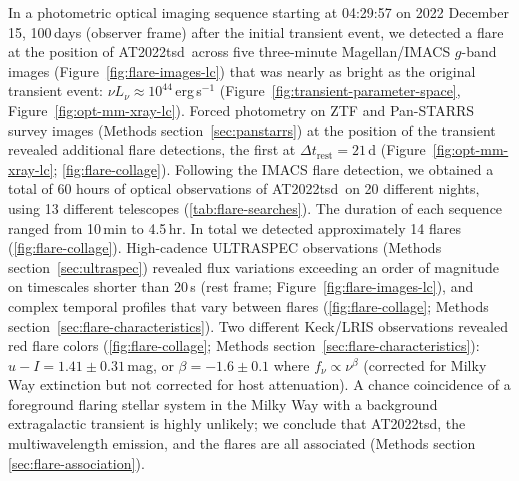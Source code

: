 \documentclass{nature_plusfigure}
\newcommand{\at}{AT2022tsd}
\begin{document}
In a photometric optical imaging sequence starting at 04:29:57 on 2022 December 15, 100\,days (observer frame) after the initial transient event, we detected\cite{Ho2022_Astronote_Flares} a flare at the position of \at\ across five three-minute Magellan/IMACS $g$-band images (Figure~\ref{fig:flare-images-lc}) that was nearly as bright as the original transient event: $\nu L_\nu \approx 10^{44}\,$erg\,s$^{-1}$ (Figure~\ref{fig:transient-parameter-space}, Figure~\ref{fig:opt-mm-xray-lc}).
Forced photometry on ZTF and Pan-STARRS survey images (Methods section~\ref{sec:panstarrs}) at the position of the transient revealed additional flare detections, the first at $\Delta t_\mathrm{rest}=21$\,d (Figure~\ref{fig:opt-mm-xray-lc}; \ref{fig:flare-collage}).
Following the IMACS flare detection, we obtained a total of 60 hours of optical observations of \at\ on 20 different nights, using 13 different telescopes (\ref{tab:flare-searches}). The duration of each sequence ranged from 10\,min to 4.5\,hr. In total we detected approximately 14 flares (\ref{fig:flare-collage}). High-cadence ULTRASPEC observations (Methods section~\ref{sec:ultraspec}) revealed flux variations exceeding an order of magnitude on timescales shorter than 20\,s (rest frame; Figure~\ref{fig:flare-images-lc}), and complex temporal profiles that vary between flares (\ref{fig:flare-collage}; Methods section~\ref{sec:flare-characteristics}).
Two different Keck/LRIS observations revealed red flare colors (\ref{fig:flare-collage}; Methods section~\ref{sec:flare-characteristics}):
$u-I=1.41\pm0.31\,$mag, or $\beta=-1.6\pm0.1$ where
$f_\nu \propto \nu^{\beta}$ (corrected for Milky Way extinction but not corrected for host attenuation).
A chance coincidence of a foreground flaring stellar system in the Milky Way with a background extragalactic transient is highly unlikely; we conclude that \at, the multiwavelength emission, and the flares are all associated (Methods section \ref{sec:flare-association}).
\end{document}

